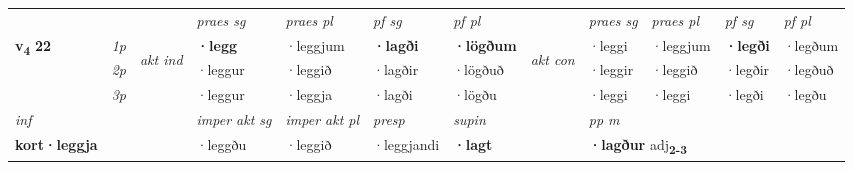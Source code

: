 \begin{longtable}[l]{X>{\footnotesize\itshape}llXXXXlXXXX}
 & &   & \textit{praes sg}  & \textit{praes pl}    & \textit{ pf sg} & \textit{pf pl} & & \textit{praes sg}  & \textit{praes pl}    & \textit{pf sg} & \textit{pf pl }  \\ \cmidrule{4-7} \cmidrule{9-12}
 \multirow{2}{*}{{{\textbf{v{\textsubscript{4}}} \Large{\textbf{22}}}}}  & 1p & \multirow{3}{*}{\begin{turn}{90}\textit{akt ind}\end{turn}} & \textbf{·legg} & ·leggjum & \textbf{·lagði} & \textbf{·lögðum} & \multirow{3}{*}{\begin{turn}{90}\textit{akt con}\end{turn}} &·leggi & ·leggjum & \textbf{·legði} & ·legðum\\*
 & 2p &  &  ·leggur  & ·leggið & ·lagðir & ·lögðuð & & ·leggir & ·leggið & ·legðir & ·legðuð \\*
 & 3p &  & ·leggur & ·leggja & ·lagði & ·lögðu & & ·leggi & ·leggi& ·legði & ·legðu \\*
\cmidrule{4-7} \cmidrule{9-12}

   {\textit{inf}} & &  & \textit{imper akt sg} & \textit{imper akt pl}   & \textit{presp} & \textit{supin}  && \textit{pp m} \\*
  {\textbf{kort\allowbreak ·leggja}} & && ·leggðu  & ·leggið   & ·leggjandi &  \textbf{·lagt}  && \multicolumn{2}{l}{\textbf{·lagður} adj\textbf{\textsubscript{2-3}}} \\*


\end{longtable}
